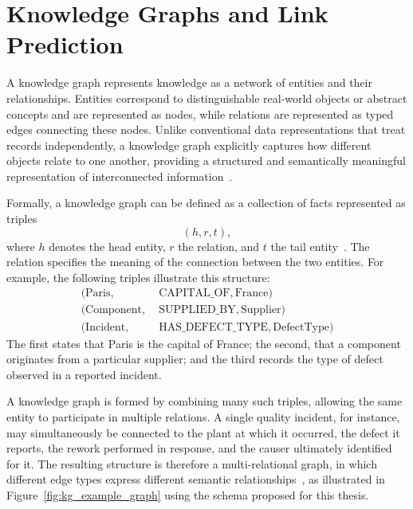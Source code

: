 \section{Knowledge Graphs and Link Prediction}\label{sec:fund_kg}

A knowledge graph represents knowledge as a network of entities and their
relationships. Entities correspond to distinguishable real-world objects
or abstract concepts and are represented as nodes, while relations are
represented as typed edges connecting these nodes. Unlike conventional
data representations that treat records independently, a knowledge graph
explicitly captures how different objects relate to one another, providing
a structured and semantically meaningful representation of interconnected
information~\cite{ji2021survey}.

Formally, a knowledge graph can be defined as a collection of facts
represented as triples
\[
  (h, r, t),
\]
where $h$ denotes the head entity, $r$ the relation, and $t$ the tail
entity~\cite{ji2021survey, wang2017kgesurvey}. The relation specifies the
meaning of the connection between the two entities. For example, the
following triples illustrate this structure:
\[
\begin{aligned}
  (\text{Paris},     \;&\text{CAPITAL\_OF},  \text{France})   \\
  (\text{Component},\;&\text{SUPPLIED\_BY},\text{Supplier})  \\
  (\text{Incident},  \;&\text{HAS\_DEFECT\_TYPE},  \text{DefectType})
\end{aligned}
\]
The first states that Paris is the capital of France; the second, that a
component originates from a particular supplier; and the third records
the type of defect observed in a reported incident.

A knowledge graph is formed by combining many such triples, allowing the
same entity to participate in multiple relations. A single quality
incident, for instance, may simultaneously be connected to the plant at
which it occurred, the defect it reports, the rework performed in
response, and the causer ultimately identified for it. The resulting
structure is therefore a multi-relational graph, in which different edge
types express different semantic relationships~\cite{wang2017kgesurvey},
as illustrated in Figure~\ref{fig:kg_example_graph} using the schema
proposed for this thesis.

